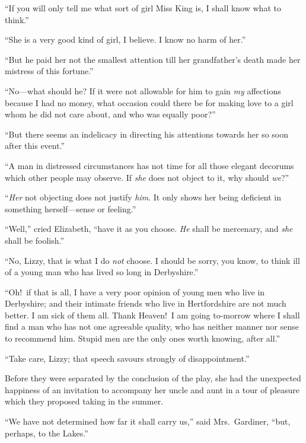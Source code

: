 \documentclass[12pt,english,oneside]{book}
\begin{document}
{}``If you will only tell me what sort of girl Miss King is, I shall
know what to think.''

{}``She is a very good kind of girl, I believe. I know no harm of
her.''

{}``But he paid her not the smallest attention till her grandfather's
death made her mistress of this fortune.''

{}``No\mbox{---}what should he? If it were not allowable for him
to gain \textit{my} affections because I had no money, what occasion
could there be for making love to a girl whom he did not care about,
and who was equally poor?''\ 

{}``But there seems an indelicacy in directing his attentions towards
her so soon after this event.''

{}``A man in distressed circumstances has not time for all those
elegant decorums which other people may observe. If \textit{she} does
not object to it, why should \textit{we}?''\ 

{}``\textit{Her} not objecting does not justify \textit{him}. It
only shows her being deficient in something herself\mbox{---}sense
or feeling.''

{}``Well,'' cried Elizabeth, {}``have it as you choose. \textit{He}
shall be mercenary, and \textit{she} shall be foolish.''

{}``No, Lizzy, that is what I do \textit{not} choose. I should be
sorry, you know, to think ill of a young man who has lived so long
in Derbyshire.''

{}``Oh!\ if that is all, I have a very poor opinion of young men
who live in Derbyshire; and their intimate friends who live in Hertfordshire
are not much better. I am sick of them all. Thank Heaven!\ I am going
to-morrow where I shall find a man who has not one agreeable quality,
who has neither manner nor sense to recommend him. Stupid men are
the only ones worth knowing, after all.''

{}``Take care, Lizzy; that speech savours strongly of disappointment.''

Before they were separated by the conclusion of the play, she had
the unexpected happiness of an invitation to accompany her uncle and
aunt in a tour of pleasure which they proposed taking in the summer.

{}``We have not determined how far it shall carry us,'' said Mrs.\ 
Gardiner, {}``but, perhaps, to the Lakes.''
\end{document}
